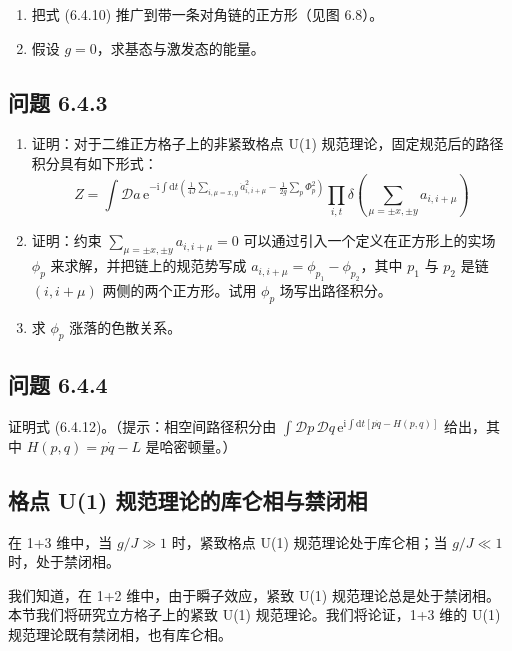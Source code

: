 \begin{enumerate}
\item[(a)] 把式 (6.4.10) 推广到带一条对角链的正方形（见图 6.8）。
\item[(b)] 假设 $g=0$，求基态与激发态的能量。
\end{enumerate}

\subsection*{问题 6.4.3}

\begin{enumerate}
\item[(a)] 证明：对于二维正方格子上的非紧致格点 U(1) 规范理论，固定规范后的路径积分具有如下形式：
\begin{equation*}
Z=\int\mathcal{D}a\,\mathrm{e}^{-\mathrm{i}\int\mathrm{d}t\left(\frac{1}{4J}\sum_{i,\mu=x,y}\dot{a}_{i,i+\mu}^{2}-\frac{1}{2g}\sum_{p}\Phi_{p}^{2}\right)}\prod_{i,t}\delta\left(\sum_{\mu=\pm x,\pm y}a_{i,i+\mu}\right)
\end{equation*}
\item[(b)] 证明：约束 $\sum_{\mu=\pm x,\pm y}a_{i,i+\mu}=0$ 可以通过引入一个定义在正方形上的实场 $\phi_{p}$ 来求解，并把链上的规范势写成 $a_{i,i+\mu}=\phi_{p_{1}}-\phi_{p_{2}}$，其中 $p_{1}$ 与 $p_{2}$ 是链 $(i,i+\mu)$ 两侧的两个正方形。试用 $\phi_{p}$ 场写出路径积分。
\item[(c)] 求 $\phi_{p}$ 涨落的色散关系。
\end{enumerate}

\subsection*{问题 6.4.4}

证明式 (6.4.12)。（提示：相空间路径积分由 $\int\mathcal{D}p\,\mathcal{D}q\,\mathrm{e}^{\mathrm{i}\int\mathrm{d}t[p\dot{q}-H(p,q)]}$ 给出，其中 $H(p,q)=p\dot{q}-L$ 是哈密顿量。）

\subsection{格点 U(1) 规范理论的库仑相与禁闭相}

\begin{keypoints}
\item 在 1+3 维中，当 $g/J\gg1$ 时，紧致格点 U(1) 规范理论处于库仑相；当 $g/J\ll1$ 时，处于禁闭相。
\end{keypoints}

我们知道，在 1+2 维中，由于瞬子效应，紧致 U(1) 规范理论总是处于禁闭相。本节我们将研究立方格子上的紧致 U(1) 规范理论。我们将论证，1+3 维的 U(1) 规范理论既有禁闭相，也有库仑相。

